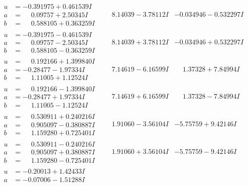 \documentclass[1p]{elsarticle_modified}
\theoremstyle{definition}
\begin{document}
$$\begin{array}{c|c|c}
\begin{aligned}
u &= -0.391975 + 0.461539 I \\
a &= \phantom{-}0.09757 + 2.50345 I \\
b &= \phantom{-}0.588105 + 0.363259 I\end{aligned}
 & \phantom{-}8.14039 - 3.78112 I & -0.034946 - 0.532297 I \\ \hline\begin{aligned}
u &= -0.391975 - 0.461539 I \\
a &= \phantom{-}0.09757 - 2.50345 I \\
b &= \phantom{-}0.588105 - 0.363259 I\end{aligned}
 & \phantom{-}8.14039 + 3.78112 I & -0.034946 + 0.532297 I \\ \hline\begin{aligned}
u &= \phantom{-}0.192166 + 1.399840 I \\
a &= -0.28477 - 1.97334 I \\
b &= \phantom{-}1.11005 + 1.12524 I\end{aligned}
 & \phantom{-}7.14619 - 6.16599 I & \phantom{-}1.37328 + 7.84994 I \\ \hline\begin{aligned}
u &= \phantom{-}0.192166 - 1.399840 I \\
a &= -0.28477 + 1.97334 I \\
b &= \phantom{-}1.11005 - 1.12524 I\end{aligned}
 & \phantom{-}7.14619 + 6.16599 I & \phantom{-}1.37328 - 7.84994 I \\ \hline\begin{aligned}
u &= \phantom{-}0.530911 + 0.240216 I \\
a &= \phantom{-}0.905097 - 0.380887 I \\
b &= \phantom{-}1.159280 + 0.725401 I\end{aligned}
 & \phantom{-}1.91060 - 3.56104 I & -5.75759 + 9.42146 I \\ \hline\begin{aligned}
u &= \phantom{-}0.530911 - 0.240216 I \\
a &= \phantom{-}0.905097 + 0.380887 I \\
b &= \phantom{-}1.159280 - 0.725401 I\end{aligned}
 & \phantom{-}1.91060 + 3.56104 I & -5.75759 - 9.42146 I \\ \hline\begin{aligned}
u &= -0.20013 + 1.42433 I \\
a &= -0.07006 - 1.51288 I \\

\end{aligned}
\end{array}$$
\end{document}
